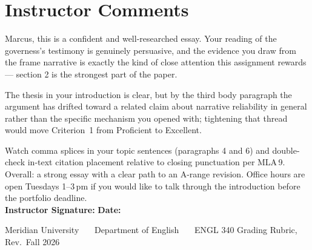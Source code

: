 \documentclass[11pt,a4paper]{scrartcl}
\begin{document}
\section*{Instructor Comments}
\begin{tcolorbox}[colback=white,colframe=slate!60,boxrule=0.5pt,arc=2pt,left=10pt,right=10pt,top=8pt,bottom=8pt]
\small
Marcus, this is a confident and well-researched essay. Your reading of the governess's testimony
is genuinely persuasive, and the evidence you draw from the frame narrative is exactly the kind of
close attention this assignment rewards --- section 2 is the strongest part of the paper.

The thesis in your introduction is clear, but by the third body paragraph the argument has drifted
toward a related claim about narrative reliability in general rather than the specific mechanism you
opened with; tightening that thread would move Criterion~1 from Proficient to Excellent.

Watch comma splices in your topic sentences (paragraphs 4 and 6) and double-check in-text citation
placement relative to closing punctuation per MLA\,9. Overall: a strong essay with a clear path to an
A-range revision. Office hours are open Tuesdays 1--3\,pm if you would like to talk through the
introduction before the portfolio deadline.\\[4mm]
\textbf{Instructor Signature:} \makebox[4.5cm]{\dotfill} \hfill \textbf{Date:} \makebox[3cm]{\dotfill}
\end{tcolorbox}

\vfill
\begin{center}
\small\color{slate} Meridian University \ \textbullet\ \ Department of English \ \textbullet\ \ ENGL 340 Grading Rubric, Rev.\ Fall 2026
\end{center}
\end{document}

